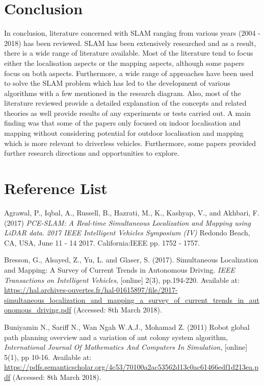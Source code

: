 \documentclass[a4paper, 12pt]{article}
\begin{document}
\section{Conclusion}
In conclusion, literature concerned with SLAM ranging from various years (2004 - 2018) has been reviewed. SLAM has been extensively researched and as a result, there is a wide range of literature available. Most of the literature tend to focus either the localisation aspects or the mapping aspects, although some papers focus on both aspects. Furthermore, a wide range of approaches have been used to solve the SLAM problem which has led to the development of various algorithms with a few mentioned in the research diagram. Also, most of the literature reviewed provide a detailed explanation of the concepts and related theories as well provide results of any experiments or tests carried out. A main finding was that some of the papers only focused on indoor localisation and mapping without considering potential for outdoor localisation and mapping which is more relevant to driverless vehicles. Furthermore, some papers provided further research directions and opportunities to explore. 


\newpage
\section{Reference List}

Agrawal, P., Iqbal, A., Russell, B., Hazrati, M., K., Kashyap, V.,
and Akhbari, F. (2017) \textit{PCE-SLAM: A Real-time Simultaneous Localization and Mapping using LiDAR data}. \textit{2017 IEEE Intelligent Vehicles Symposium (IV)} Redondo Beach, CA, USA, June 11 - 14 2017. California:IEEE pp. 1752 - 1757.

Bresson, G., Alsayed, Z., Yu, L. and Glaser, S. (2017). Simultaneous Localization and Mapping: A Survey of Current Trends in Autonomous Driving. \textit{IEEE Transactions on Intelligent Vehicles}, [online] 2(3), pp.194-220. Available at: \url{https://hal.archives-ouvertes.fr/hal-01615897/file/2017-simultaneous_localization_and_mapping_a_survey_of_current_trends_in_autonomous_driving.pdf} (Accessed: 8th March 2018).

Buniyamin N., Sariff N., Wan Ngah W.A.J., Mohamad Z. (2011) Robot global path planning overview and a variation of ant colony system algorithm, \textit{International Journal Of Mathematics And Computers In Simulation}, [online] 5(1), pp 10-16. Available at: \url{https://pdfs.semanticscholar.org/4c53/70100a2ac53562d13c0ac61466edf1d213ea.pdf} (Accessed: 8th March 2018).   
\end{document}
